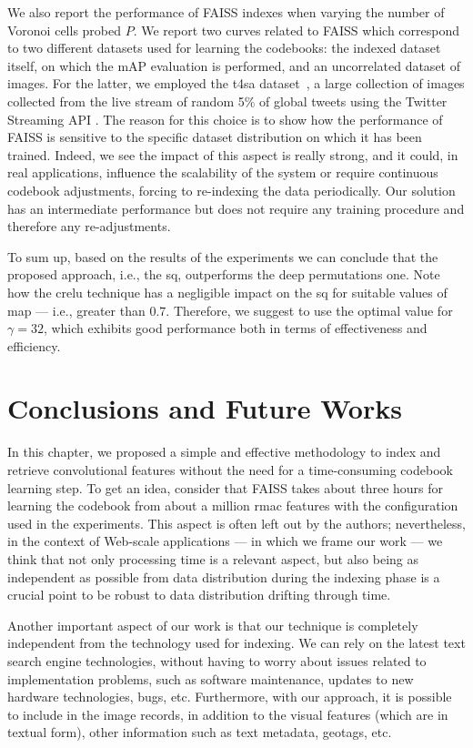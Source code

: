 We also report the performance of FAISS indexes when varying the number of Voronoi cells probed $P$.
We report two curves related to FAISS which correspond to two different datasets used for learning the codebooks: the indexed dataset itself, on which the mAP evaluation is performed, and an uncorrelated dataset of images.
For the latter, we employed the \gls{t4sa} dataset~\cite{vadicamo2017cross}, a large collection of images collected from the live stream of random 5\% of global tweets using the Twitter Streaming API .
The reason for this choice is to show how the performance of FAISS is sensitive to the specific dataset distribution on which it has been trained.
Indeed, we see the impact of this aspect is really strong, and it could, in real applications, influence the scalability of the system or require continuous codebook adjustments, forcing to re-indexing the data periodically.
Our solution has an intermediate performance but does not require any training procedure and therefore any re-adjustments.

To sum up, based on the results of the experiments we can conclude that the proposed approach, i.e., the \gls{sq}, outperforms the deep permutations one.
Note how the \gls{crelu} technique has a negligible impact on the \gls{sq} for suitable values of \gls{map} --- i.e., greater than $0.7$.
Therefore, we suggest to use the optimal value for $\gamma=32$, which exhibits good performance both in terms of effectiveness and efficiency.


\section{Conclusions and Future Works}
\label{sec:str:conclusion}
In this chapter, we proposed a simple and effective methodology to index and retrieve convolutional features without the need for a time-consuming codebook learning step.
To get an idea, consider that FAISS takes about three hours for learning the codebook from about a million \gls{rmac} features with the configuration used in the experiments.
This aspect is often left out by the authors; nevertheless, in the context of Web-scale applications --- in which we frame our work --- we think that not only processing time is a relevant aspect, but also being as independent as possible from data distribution during the indexing phase is a crucial point to be robust to data distribution drifting through time.

Another important aspect of our work is that our technique is completely independent from the technology used for indexing.
We can rely on the latest text search engine technologies, without having to worry about issues related to implementation problems, such as software maintenance, updates to new hardware technologies, bugs, etc.
Furthermore, with our approach, it is possible to include in the image records, in addition to the visual features (which are in textual form), other information such as text metadata, geotags, etc.

